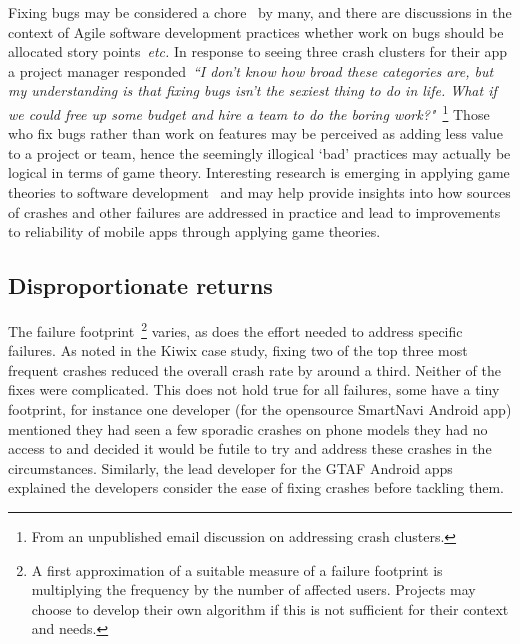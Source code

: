 Fixing bugs may be considered a chore~\citep{scrumdictionary_chore} by many, and there are discussions in the context of Agile software development practices whether work on bugs should be allocated story points~\emph{etc.} In response to seeing three crash clusters for their app a project manager responded~\emph{``I don’t know how broad these categories are, but my understanding is that fixing bugs isn’t the sexiest thing to do in life. What if we could free up some budget and hire a team to do the boring work?"}~\footnote{From an unpublished email discussion on addressing crash clusters.}  Those who fix bugs rather than work on features may be perceived as adding less value to a project or team, hence the seemingly illogical `bad' practices may actually be logical in terms of game theory. Interesting research is emerging in applying game theories to software development~\citep{GAVIDIACALDERON2021_game_theoretic_analysis_of_software_development_practices} and may help provide insights into how sources of crashes and other failures are addressed in practice and lead to improvements to reliability of mobile apps through applying game theories.

\subsection{Disproportionate returns}
The failure footprint~\footnote{A first approximation of a suitable measure of a failure footprint is multiplying the frequency by the number of affected users. Projects may choose to develop their own algorithm if this is not sufficient for their context and needs.} varies, as does the effort needed to address specific failures. As noted in the Kiwix case study, fixing two of the top three most frequent crashes reduced the overall crash rate by around a third. Neither of the fixes were complicated. This does not hold true for all failures, some have a tiny footprint, for instance one developer (for the opensource SmartNavi Android app)
mentioned they had seen a few sporadic crashes on phone models they had no access to and decided it would be futile to try and address these crashes in the circumstances. Similarly, the lead developer for the GTAF Android apps explained the developers consider the ease of fixing crashes before tackling them. 

